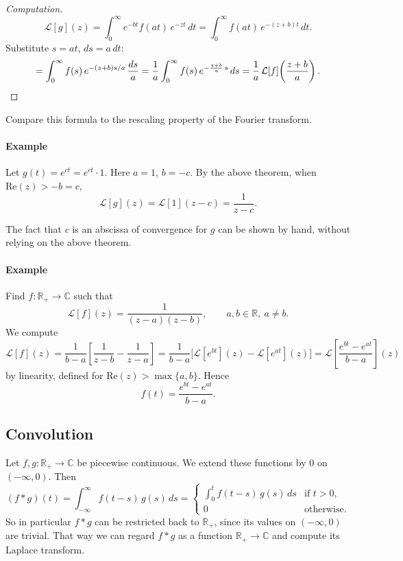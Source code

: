 \begin{proof}[Computation]
\[
\mathcal{L}[g](z) = \int_0^{\infty} e^{-bt} f(at)\,e^{-zt}\,dt
= \int_0^{\infty} f(at)\,e^{-(z+b)t}\,dt.
\]
Substitute $s = at$, $ds = a\,dt$:
\[
= \int_0^{\infty} f(s)\,e^{-(z+b)s/a}\,\frac{ds}{a}
= \frac{1}{a}\int_0^{\infty} f(s)\,e^{-\frac{z+b}{a}\,s}\,ds
= \frac{1}{a}\,\mathcal{L}[f]\!\left(\frac{z+b}{a}\right). \qedhere
\]
\end{proof}

\begin{remark}
Compare this formula to the rescaling property of the Fourier transform.
\end{remark}

\paragraph{Example}
\begin{example}
Let $g(t) = e^{ct} = e^{ct}\cdot 1$. Here $a = 1$, $b = -c$. By the above theorem, when $\mathrm{Re}(z) > -b = c$,
\[
\mathcal{L}[g](z) = \mathcal{L}[1](z - c) = \frac{1}{z - c}.
\]
\end{example}

\begin{remark}
The fact that $c$ is an abscissa of convergence for $g$ can be shown by hand, without relying on the above theorem.
\end{remark}

\paragraph{Example}
\begin{example}
Find $f : \mathbb{R}_+ \to \mathbb{C}$ such that
\[
\mathcal{L}[f](z) = \frac{1}{(z-a)(z-b)}, \qquad a, b \in \mathbb{R},\ a \neq b.
\]
We compute
\[
\mathcal{L}[f](z) = \frac{1}{b - a}\left[\frac{1}{z - b} - \frac{1}{z - a}\right]
= \frac{1}{b - a}\bigl[\mathcal{L}[e^{bt}](z) - \mathcal{L}[e^{at}](z)\bigr]
= \mathcal{L}\!\left[\frac{e^{bt} - e^{at}}{b - a}\right](z)
\]
by linearity, defined for $\mathrm{Re}(z) > \max\{a, b\}$. Hence
\[
f(t) = \frac{e^{bt} - e^{at}}{b - a}.
\]
\end{example}

\subsection{Convolution}

Let $f, g : \mathbb{R}_+ \to \mathbb{C}$ be piecewise continuous. We extend these functions by $0$ on $(-\infty, 0)$. Then
\[
(f * g)(t) = \int_{-\infty}^{\infty} f(t - s)\,g(s)\,ds
= \begin{cases}
\displaystyle\int_0^t f(t - s)\,g(s)\,ds & \text{if } t > 0, \\
0 & \text{otherwise.}
\end{cases}
\]
So in particular $f * g$ can be restricted back to $\mathbb{R}_+$, since its values on $(-\infty, 0)$ are trivial. That way we can regard $f * g$ as a function $\mathbb{R}_+ \to \mathbb{C}$ and compute its Laplace transform.

